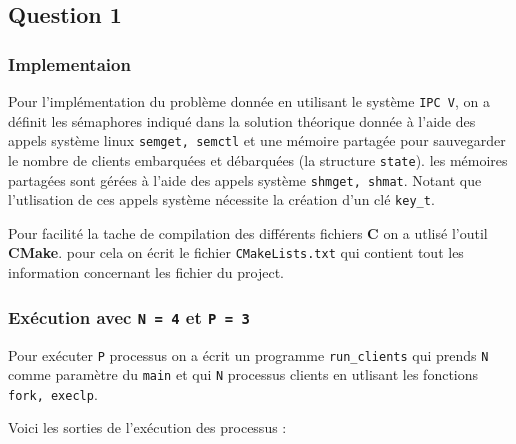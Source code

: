 \subsection{Question 1}
\subsubsection{Implementaion}
Pour l'implémentation du problème donnée en utilisant le système \texttt{IPC V},
on a définit les sémaphores indiqué dans la solution théorique donnée à l'aide
des appels système  linux \texttt{semget, semctl} et une mémoire partagée pour
sauvegarder le nombre de clients embarquées et débarquées (la structure
\texttt{state}). les mémoires partagées sont gérées à l'aide des appels système 
\texttt{shmget, shmat}. Notant que l'utlisation de ces appels système nécessite la création d'un clé \texttt{key\_t}.

Pour facilité la tache de compilation des différents fichiers \textbf{C} on a
utlisé l'outil \textbf{CMake}. pour cela on écrit le fichier
\texttt{CMakeLists.txt} qui contient tout les information concernant les fichier
du project.

\subsubsection{Exécution avec \texttt{N = 4} et \texttt{P = 3}}
Pour exécuter \texttt{P} processus on a écrit un programme \texttt{run\_clients}
qui prends \texttt{N} comme  paramètre du \texttt{main} et qui \texttt{N}
processus clients en utlisant les fonctions \texttt{fork, execlp}.

Voici les sorties de l'exécution des processus :






